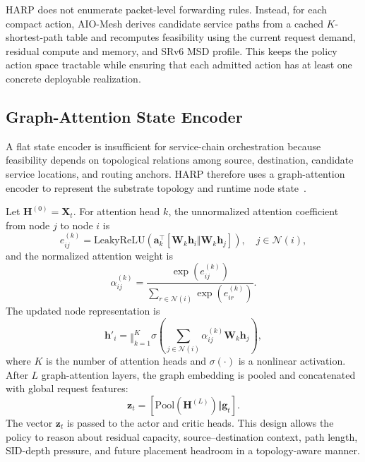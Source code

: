 \documentclass[final,5p]{elsarticle}
\begin{document}
HARP does not enumerate packet-level forwarding rules. Instead, for each compact action, AIO-Mesh derives candidate service paths from a cached \(K\)-shortest-path table and recomputes feasibility using the current request demand, residual compute and memory, and SRv6 MSD profile. This keeps the policy action space tractable while ensuring that each admitted action has at least one concrete deployable realization.

\subsection{Graph-Attention State Encoder}
\label{subsec:harp_gat}

A flat state encoder is insufficient for service-chain orchestration because feasibility depends on topological relations among source, destination, candidate service locations, and routing anchors. HARP therefore uses a graph-attention encoder to represent the substrate topology and runtime node state~\cite{velickovic2018graph}.

Let \(\mathbf{H}^{(0)}=\mathbf{X}_t\). For attention head \(k\), the unnormalized attention coefficient from node \(j\) to node \(i\) is
\begin{equation}
    e_{ij}^{(k)}
    =
    \mathrm{LeakyReLU}
    \left(
    \mathbf{a}_{k}^{\top}
    [\mathbf{W}_{k}\mathbf{h}_i \Vert \mathbf{W}_{k}\mathbf{h}_j]
    \right),
    \quad j\in\mathcal{N}(i),
\end{equation}
and the normalized attention weight is
\begin{equation}
    \alpha_{ij}^{(k)}
    =
    \frac{\exp(e_{ij}^{(k)})}
    {\sum_{r\in\mathcal{N}(i)}\exp(e_{ir}^{(k)})}.
\end{equation}
The updated node representation is
\begin{equation}
    \mathbf{h}'_i
    =
    \mathop{\Vert}_{k=1}^{K}
    \sigma
    \left(
    \sum_{j\in\mathcal{N}(i)}
    \alpha_{ij}^{(k)}\mathbf{W}_{k}\mathbf{h}_j
    \right),
\end{equation}
where \(K\) is the number of attention heads and \(\sigma(\cdot)\) is a nonlinear activation. After \(L\) graph-attention layers, the graph embedding is pooled and concatenated with global request features:
\begin{equation}
    \mathbf{z}_t=
    [\mathrm{Pool}(\mathbf{H}^{(L)})\Vert \mathbf{g}_t].
\end{equation}
The vector \(\mathbf{z}_t\) is passed to the actor and critic heads. This design allows the policy to reason about residual capacity, source--destination context, path length, SID-depth pressure, and future placement headroom in a topology-aware manner.
\end{document}
